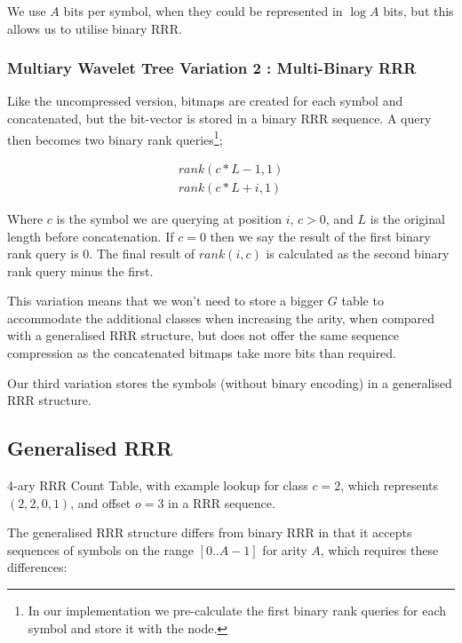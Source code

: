 We use $A$ bits per symbol, when they could be represented in $\log A$ bits, but
this allows us to utilise binary RRR.

\subsubsection{Multiary Wavelet Tree Variation 2 : Multi-Binary RRR}
Like the uncompressed version, bitmaps are created for each symbol and 
concatenated, but the bit-vector is stored in a binary RRR sequence. A query 
then becomes two binary rank queries\footnote{In our implementation we 
pre-calculate the first binary rank queries for each symbol and store it with 
the node.};

	\begin{align}
	rank(c * L - 1, 1) \\
	rank(c * L + i, 1)
	\end{align}

Where $c$ is the symbol we are querying at position $i$,
$c > 0$, and $L$ is 
the original length before concatenation. If $c = 0$ then we say the result of 
the first binary rank query is $0$. The final result of $rank(i, c)$ is 
calculated as the second binary rank query minus the first.

This variation means that we won't need to store a bigger $G$ table to 
accommodate the additional classes when increasing the arity, when compared with
a generalised RRR structure, but does not offer the same sequence compression as
the concatenated bitmaps take more bits than required.

Our third variation stores the symbols (without binary encoding) in a 
generalised RRR structure.

\subsection{Generalised RRR}

	{4-ary RRR Count Table, with example lookup for class $c = 2$, 
	which represents $(2, 2, 0, 1)$, and offset $o = 3$ in a RRR
	sequence.}
	
The generalised RRR structure differs from binary RRR in that it accepts
sequences of symbols on the range $[0..A-1]$ for arity $A$, which requires these
differences:

